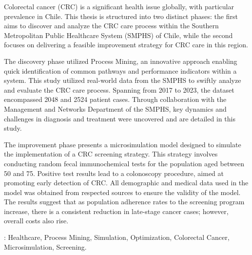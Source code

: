 Colorectal cancer (CRC) is a significant health issue globally, with particular prevalence in Chile. This thesis is structured into two distinct phases: the first aims to discover and analyze the CRC care process within the Southern Metropolitan Public Healthcare System (SMPHS) of Chile, while the second focuses on delivering a feasible improvement strategy for CRC care in this region.

The discovery phase utilized Process Mining, an innovative approach enabling quick identification of common pathways and performance indicators within a system. This study utilized real-world data from the SMPHS to swiftly analyze and evaluate the CRC care process. Spanning from 2017 to 2023, the dataset encompassed 2048 and 2524 patient cases. Through collaboration with the Management and Networks Department of the SMPHS, key dynamics and challenges in diagnosis and treatment were uncovered and are detailed in this study.

The improvement phase presents a microsimulation model designed to simulate the implementation of a CRC screening strategy. This strategy involves conducting random fecal immunochemical tests for the population aged between 50 and 75. Positive test results lead to a colonoscopy procedure, aimed at promoting early detection of CRC. All demographic and medical data used in the model was obtained from respected sources to ensure the validity of the model. The results suggest that as population adherence rates to the screening program increase, there is a consistent reduction in late-stage cancer cases; however, overall costs also rise.

\vfill
{}:  Healthcare, Process Mining, Simulation, Optimization, Colorectal Cancer, Microsimulation, Screening.
